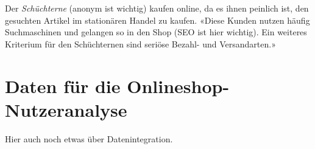 Der \textit{Schüchterne} (anonym ist wichtig) kaufen online, da es ihnen peinlich ist, den gesuchten Artikel im stationären Handel zu kaufen. «Diese Kunden nutzen häufig Suchmaschinen und gelangen so in den Shop (SEO ist hier wichtig). Ein weiteres Kriterium für den Schüchternen sind seriöse Bezahl- und Versandarten.»

\section{Daten für die Onlineshop-Nutzeranalyse}
Hier auch noch etwas über Datenintegration.
